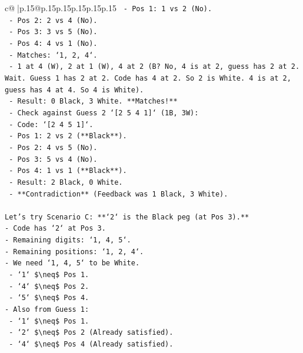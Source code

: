 \documentclass{article}
\begin{document}
{\begin{supertabular}{c@{$\;$}|p{.15\linewidth}@{}p{.15\linewidth}p{.15\linewidth}p{.15\linewidth}p{.15\linewidth}p{.15\linewidth}}
{{{\texttt{         {-} Pos 1: 1 vs 2 (No).} \\
\texttt{         {-} Pos 2: 2 vs 4 (No).} \\
\texttt{         {-} Pos 3: 3 vs 5 (No).} \\
\texttt{         {-} Pos 4: 4 vs 1 (No).} \\
\texttt{         {-} Matches: `1, 2, 4`.} \\
\texttt{         {-} 1 at 4 (W), 2 at 1 (W), 4 at 2 (B? No, 4 is at 2, guess has 2 at 2. Wait. Guess 1 has 2 at 2. Code has 4 at 2. So 2 is White. 4 is at 2, guess has 4 at 4. So 4 is White).} \\
\texttt{         {-} Result: 0 Black, 3 White. **Matches!**} \\
\texttt{       {-} Check against Guess 2 `{[}2 5 4 1{]}` (1B, 3W):} \\
\texttt{         {-} Code: `{[}2 4 5 1{]}`.} \\
\texttt{         {-} Pos 1: 2 vs 2 (**Black**).} \\
\texttt{         {-} Pos 2: 4 vs 5 (No).} \\
\texttt{         {-} Pos 3: 5 vs 4 (No).} \\
\texttt{         {-} Pos 4: 1 vs 1 (**Black**).} \\
\texttt{         {-} Result: 2 Black, 0 White.} \\
\texttt{         {-} **Contradiction** (Feedback was 1 Black, 3 White).} \\
\\ 
\texttt{Let's try Scenario C: **`2` is the Black peg (at Pos 3).**} \\
\texttt{{-} Code has `2` at Pos 3.} \\
\texttt{{-} Remaining digits: `1, 4, 5`.} \\
\texttt{{-} Remaining positions: `1, 2, 4`.} \\
\texttt{{-} We need `1, 4, 5` to be White.} \\
\texttt{    {-} `1` \$\textbackslash{}neq\$ Pos 1.} \\
\texttt{    {-} `4` \$\textbackslash{}neq\$ Pos 2.} \\
\texttt{    {-} `5` \$\textbackslash{}neq\$ Pos 4.} \\
\texttt{{-} Also from Guess 1:} \\
\texttt{    {-} `1` \$\textbackslash{}neq\$ Pos 1.} \\
\texttt{    {-} `2` \$\textbackslash{}neq\$ Pos 2 (Already satisfied).} \\
\texttt{    {-} `4` \$\textbackslash{}neq\$ Pos 4 (Already satisfied).} \\
}}}
\end{supertabular}}
\end{document}
